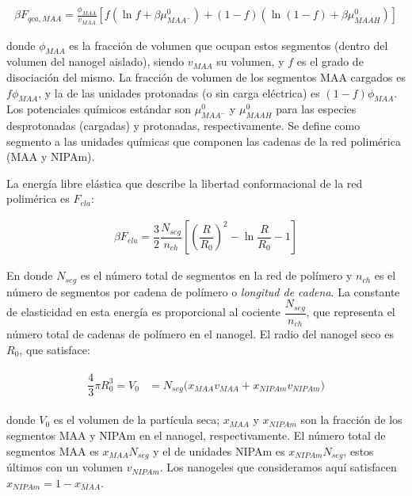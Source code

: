 	
	\begin{align}
		\beta F_{qca, MAA} =  \frac{\phi_{MAA}}{v_{MAA}} \left[f(\ln f+ \beta\mu^0_{MAA^-}) +(1-f)(\ln (1-f)+\beta\mu^0_{MAAH})\right]
	\end{align}
	
	
	\noindent donde $\phi_{MAA}$ es la fracci\'on de volumen que ocupan estos segmentos (dentro del volumen del nanogel aislado), siendo $v_{MAA}$ su volumen, y $f$ es el grado de disociaci\'on del mismo. 
	La fracci\'on de volumen de los segmentos MAA cargados es $f\phi_{MAA}$, y la de las unidades protonadas (o sin carga el\'ectrica) es $(1-f)\phi_{MAA}$.
	Los potenciales qu\'imicos est\'andar son $\mu^0_{MAA^-}$ y $\mu^0_{MAAH}$ para las especies desprotonadas (cargadas) y protonadas, respectivamente.
	Se define como segmento a las unidades qu\'imicas que componen las cadenas de la red polim\'erica (MAA y NIPAm).
	
	
	La energ\'ia libre el\'astica que describe la libertad conformacional de la red polim\'erica es $F_{ela}$: 
	
	\begin{align}
		\beta F_{ela} = \dfrac{3}{2}\dfrac{N_{seg}}{n_{ch} }\left[\left(\dfrac{R}{R_0}\right)^2 - \ln\dfrac{R}{R_0} -1\right]
	\end{align}
	
	En donde $N_{seg}$ es el n\'umero total de segmentos en la red de pol\'imero y $n_{ch}$ es el n\'umero de segmentos por cadena de pol\'imero o \emph{longitud de cadena}.
	La constante de elasticidad en esta energ\'ia es proporcional al cociente $\dfrac{N_{seg}}{n_{ch}}$, que representa el n\'umero total de cadenas de pol\'imero en el nanogel.
	El radio del nanogel seco es $R_0$, que satisface:
	
	\begin{align}
		\begin{aligned} 
			\dfrac{4}{3}\pi R_0^3=V_0&=N_{seg}\Big( x_{MAA} v_{MAA} +x_{NIPAm} v_{NIPAm}\Big)
		\end{aligned}
	\end{align}
	
	
	\noindent donde $V_0$ es el volumen de la part\'icula seca; $x_{MAA}$ y $x_{NIPAm}$ son la fracci\'on de los segmentos MAA y NIPAm en el nanogel, respectivamente. %
	El n\'umero total de segmentos MAA es $x_{MAA}N_{seg}$ y el de unidades NIPAm es $x_{NIPAm}N_{seg}$, estos \'ultimos con un volumen $v_{NIPAm}$.
	Los nanogeles que consideramos aqu\'i satisfacen $x_{NIPAm}=1-x_{MAA}$.
	
